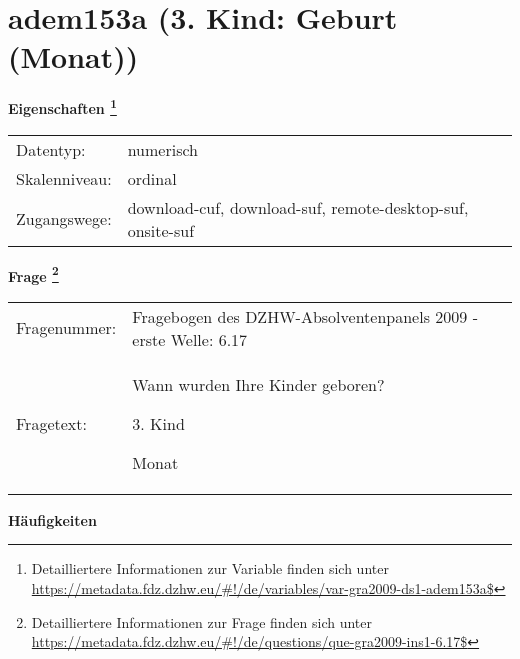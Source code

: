 
    \setcounter{footnote}{0}

    \vspace*{-1.8cm}
	\section{adem153a (3. Kind: Geburt (Monat))}
	\label{section:adem153a}



    \vspace*{0.5cm}
    \noindent\textbf{Eigenschaften
	\footnote{Detailliertere Informationen zur Variable finden sich unter
		\url{https://metadata.fdz.dzhw.eu/\#!/de/variables/var-gra2009-ds1-adem153a$}}}\\
	\begin{tabularx}{\hsize}{@{}lX}
	Datentyp: & numerisch \\
	Skalenniveau: & ordinal \\
	Zugangswege: &
	  download-cuf, 
	  download-suf, 
	  remote-desktop-suf, 
	  onsite-suf
 \\
    \end{tabularx}



				\vspace*{0.5cm}
                \noindent\textbf{Frage
	                \footnote{Detailliertere Informationen zur Frage finden sich unter
		              \url{https://metadata.fdz.dzhw.eu/\#!/de/questions/que-gra2009-ins1-6.17$}}}\\
				\begin{tabularx}{\hsize}{@{}lX}
					Fragenummer: &
					  Fragebogen des DZHW-Absolventenpanels 2009 - erste Welle:
					  6.17
 \\
					Fragetext: & Wann wurden Ihre Kinder geboren?\par  3. Kind\par  Monat \\
				\end{tabularx}





        		\vspace*{0.5cm}
                \noindent\textbf{Häufigkeiten}

